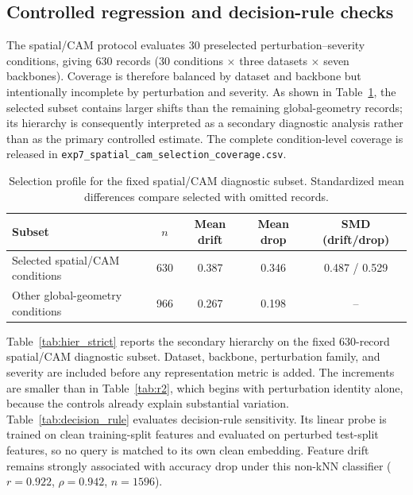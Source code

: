 \documentclass[a4paper,fleqn]{els-cas-templates/cas-sc}
\begin{document}
\subsection{Controlled regression and decision-rule checks}
\label{app:controlled_checks}

The spatial/CAM protocol evaluates 30 preselected perturbation--severity
conditions, giving 630 records (30 conditions $\times$ three datasets
$\times$ seven backbones). Coverage is therefore balanced by dataset and
backbone but intentionally incomplete by perturbation and severity. As shown in
Table~\ref{tab:spatial_selection}, the selected subset contains larger shifts
than the remaining global-geometry records; its hierarchy is consequently
interpreted as a secondary diagnostic analysis rather than as the primary
controlled estimate. The complete condition-level coverage is released in
\texttt{exp7\_spatial\_cam\_selection\_coverage.csv}.

\begin{table}[pos=htbp]
\centering
\caption{Selection profile for the fixed spatial/CAM diagnostic subset.
Standardized mean differences compare selected with omitted records.}
\label{tab:spatial_selection}
\small
\begin{tabular}{lcccc}
\toprule
Subset & $n$ & Mean drift & Mean drop & SMD (drift/drop) \\
\midrule
Selected spatial/CAM conditions & 630 & 0.387 & 0.346 & 0.487 / 0.529 \\
Other global-geometry conditions & 966 & 0.267 & 0.198 & -- \\
\bottomrule
\end{tabular}
\end{table}

Table~\ref{tab:hier_strict} reports the secondary hierarchy on the fixed
630-record spatial/CAM diagnostic subset. Dataset, backbone, perturbation
family, and severity are included before any representation metric is added.
The increments are smaller than in Table~\ref{tab:r2}, which begins with
perturbation identity alone, because the controls already explain substantial
variation. Table~\ref{tab:decision_rule} evaluates decision-rule sensitivity.
Its linear probe is trained on clean training-split features and evaluated on
perturbed test-split features, so no query is matched to its own clean
embedding. Feature drift remains strongly associated with accuracy drop under
this non-kNN classifier ($r=0.922$, $\rho=0.942$, $n=1596$).
\end{document}
